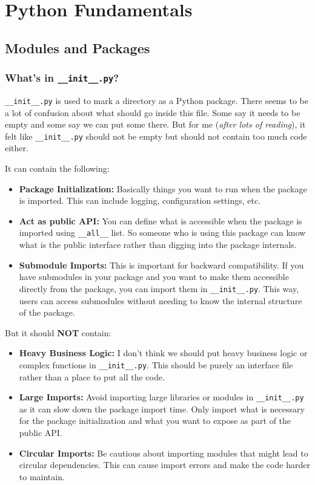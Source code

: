 \section{Python Fundamentals}
\subsection{Modules and Packages}

\subsubsection{What's in \texttt{\_\_init\_\_.py}?}
\texttt{\_\_init\_\_.py} is used to mark a directory as a Python package. There seems to be a lot of confusion about what should go inside this file. Some say it needs to be empty and some say we can put some there. But for me (\textit{after lots of reading}), it felt like \texttt{\_\_init\_\_.py} should not be empty but should not contain too much code either.

It can contain the following:
\begin{itemize}
    \item \textbf{Package Initialization:} Basically things you want to run when the package is imported. This can include logging, configuration settings, etc.
    \item \textbf{Act as public API:} You can define what is accessible when the package is imported using \texttt{\_\_all\_\_} list. So someone who is using this package can know what is the public interface rather than digging into the package internals. 
    \item \textbf{Submodule Imports:} This is important for backward compatibility. If you have submodules in your package and you want to make them accessible directly from the package, you can import them in \texttt{\_\_init\_\_.py}. This way, users can access submodules without needing to know the internal structure of the package.
\end{itemize}

But it should \textbf{NOT} contain:
\begin{itemize}
    \item \textbf{Heavy Business Logic:} I don't think we should put heavy business logic or complex functions in \texttt{\_\_init\_\_.py}. This should be purely an interface file rather than a place to put all the code.
    \item \textbf{Large Imports:} Avoid importing large libraries or modules in \texttt{\_\_init\_\_.py} as it can slow down the package import time. Only import what is necessary for the package initialization and what you want to expose as part of the public API.
    \item \textbf{Circular Imports:} Be cautious about importing modules that might lead to circular dependencies. This can cause import errors and make the code harder to maintain.
\end{itemize}

